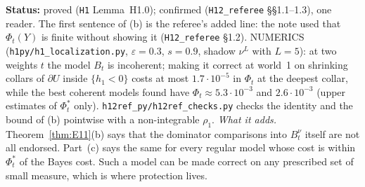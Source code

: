 \documentclass[11pt]{article}
\theoremstyle{definition}
\theoremstyle{remark}
\newcommand{\src}[1]{\texttt{#1}}
\newcommand{\status}[1]{\par\smallskip\noindent\textbf{Status:} #1\par\smallskip}
\begin{document}
\status{proved (\src{H1} Lemma~H1.0); confirmed (\src{H12\_referee} \S\S1.1--1.3), one reader. The first sentence of (b) is the referee's added line: the note used that $\Phi_t(Y)$ is finite without showing it (\src{H12\_referee} \S1.2). NUMERICS (\src{h1py/h1\_localization.py}, $\varepsilon=0.3$, $s=0.9$, shadow $\nu^L$ with $L=5$): at two weights $t$ the model $B_t$ is incoherent; making it correct at world~1 on shrinking collars of $\partial U$ inside $\{h_1<0\}$ costs at most $1.7\cdot10^{-5}$ in $\Phi_t$ at the deepest collar, while the best coherent models found have $\Phi_t\approx5.3\cdot10^{-3}$ and $2.6\cdot10^{-3}$ (upper estimates of $\Phi^*_t$ only). \src{h12ref\_py/h12ref\_checks.py} checks the identity and the bound of (b) pointwise with a non-integrable $\rho_1$. \emph{What it adds.} Theorem~\ref{thm:E11}(b) says that the dominator comparisons into $B^\nu_t$ itself are not all endorsed. Part~(c) says the same for every regular model whose cost is within $\Phi^*_t$ of the Bayes cost. Such a model can be made correct on any prescribed set of small measure, which is where protection lives.}
\end{document}
